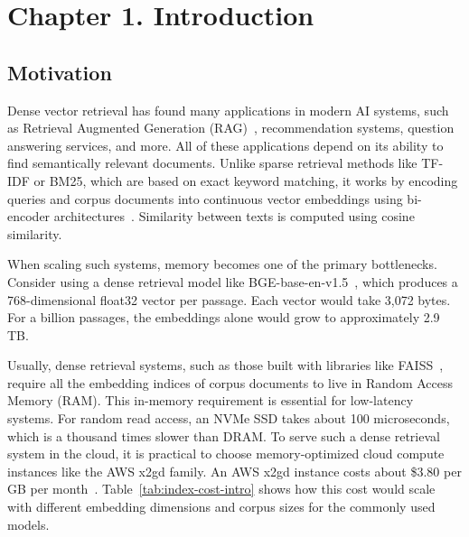 
\chapter{Chapter 1. Introduction}

\section{Motivation}

Dense vector retrieval has found many applications in modern AI systems, such as Retrieval Augmented Generation (RAG)~\cite{lewis2020retrieval}, recommendation systems, question answering services, and more. All of these applications depend on its ability to find semantically relevant documents. Unlike sparse retrieval methods like TF-IDF or BM25, which are based on exact keyword matching, it works by encoding queries and corpus documents into continuous vector embeddings using bi-encoder architectures~\cite{reimers2019sbert, karpukhin2020dense}. Similarity between texts is computed using cosine similarity.

When scaling such systems, memory becomes one of the primary bottlenecks. Consider using a dense retrieval model like BGE-base-en-v1.5~\cite{xiao2023c}, which produces a 768-dimensional float32 vector per passage. Each vector would take 3,072 bytes. For a billion passages, the embeddings alone would grow to approximately 2.9 TB.

Usually, dense retrieval systems, such as those built with libraries like FAISS~\cite{johnson2021billion}, require all the embedding indices of corpus documents to live in Random Access Memory (RAM). This in-memory requirement is essential for low-latency systems. For random read access, an NVMe SSD takes about 100 microseconds, which is a thousand times slower than DRAM. To serve such a dense retrieval system in the cloud, it is practical to choose memory-optimized cloud compute instances like the AWS x2gd family. An AWS x2gd instance costs about \$3.80 per GB per month~\cite{aws2024pricing}. Table~\ref{tab:index-cost-intro} shows how this cost would scale with different embedding dimensions and corpus sizes for the commonly used models.

